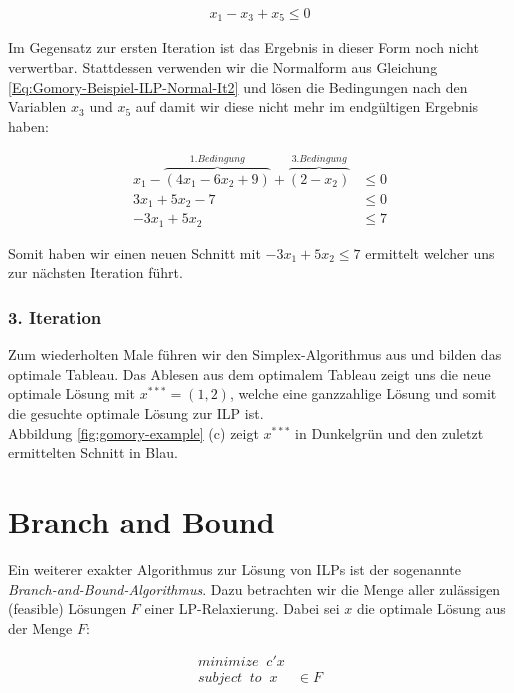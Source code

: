 \documentclass[tog]{acmsiggraph}
\begin{document}
\large
\begin{align}
\label{Eq:Gomory-Beispiel It 2 schritt 2}
x_1 - x_3 + x_5 \leq 0
\end{align}
\normalsize

Im Gegensatz zur ersten Iteration ist das Ergebnis in dieser Form noch nicht verwertbar. Stattdessen verwenden wir die Normalform aus Gleichung \ref{Eq:Gomory-Beispiel-ILP-Normal-It2} und lösen die Bedingungen nach den Variablen $x_3$ und $x_5$ auf damit wir diese nicht mehr im endgültigen Ergebnis haben:

\large
\begin{align}
\label{Eq:Gomory-Beispiel It 2 schritt 3}
x_1 - \overbrace{(4x_1 - 6x_2 + 9)}^{1. Bedingung} + \overbrace{(2 - x_2)}^{3. Bedingung} &\leq 0 \nonumber \\
3x_1 + 5x_2 - 7 &\leq 0 \nonumber \\
-3x_1 + 5x_2 &\leq 7
\end{align}
\normalsize

Somit haben wir einen neuen Schnitt mit $-3x_1 + 5x_2 \leq 7$ ermittelt welcher uns zur nächsten Iteration führt.

\subsubsection*{3. Iteration}

Zum wiederholten Male führen wir den Simplex-Algorithmus aus und bilden das optimale Tableau. Das Ablesen aus dem optimalem Tableau zeigt uns die neue optimale Lösung mit $x^{***} = (1, 2)$, welche eine ganzzahlige Lösung und somit die gesuchte optimale Lösung zur ILP ist.\\
Abbildung \ref{fig:gomory-example} (c) zeigt $x^{***}$ in Dunkelgrün und den zuletzt ermittelten Schnitt in Blau.

\section{Branch and Bound}

Ein weiterer exakter Algorithmus zur Lösung von ILPs ist der sogenannte \textit{Branch-and-Bound-Algorithmus}. Dazu betrachten wir die Menge aller zulässigen (feasible) Lösungen $F$ einer LP-Relaxierung. Dabei sei $x$ die optimale Lösung aus der Menge $F$:

\large
\begin{align}
\label{Eq:Branching-Grundlage}
minimize \;\; c'x & \nonumber \\
subject \;\; to \;\; x &\in F
\end{align}
\normalsize
\end{document}
